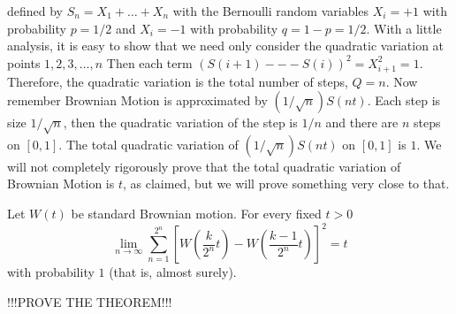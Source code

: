 {  defined by $S_n = X_1 + \ldots + X_n$ with the Bernoulli random variables 
  $X_i = +1$ with probability $p = 1/2$ and $X_i = -1$ with probability 
  $q = 1-p = 1/2$. With a little analysis, it is easy to show that we need
  only consider the quadratic variation at points $1,2,3, \ldots, n$
  Then each term $(S(i+1) --- S(i))^2 = X_{i+1}^2 = 1$.  Therefore, the
  quadratic variation is the total number of steps, $Q=n$. Now remember Brownian 
  Motion is approximated by $(1/\sqrt{n}) S(nt)$.  Each step is size $1/\sqrt{n}$, 
  then the quadratic variation of the step is $1/n$ and there are $n$ steps on $[0,1]$.  
  The total quadratic variation of $(1/\sqrt{n})S(nt)$ on $[0,1]$ is $1$.
  We will not completely rigorously prove that the total quadratic variation of
  Brownian Motion is $t$, as claimed, but we will prove something very
  close to that.
  \begin{theorem}
  Let $W(t)$ be standard Brownian motion.  For every fixed $t > 0$
  \[
    \lim_{n \to \infty}
             \sum_{n=1}^{2^n} 
               \left[ 
                  W\left( \frac{k}{2^n} t \right) - 
                  W\left( \frac{k-1}{2^n} t \right)
               \right]^2
           = t
  \]
  \ni with probability $1$ (that is, almost surely).
  \end{theorem}
  !!!PROVE THE THEOREM!!!
}

